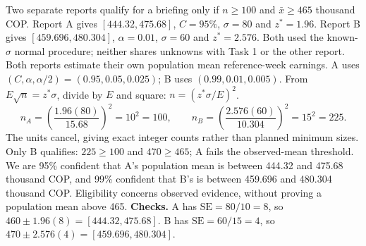 Two separate reports qualify for a briefing only if $n\ge100$ and $\bar x\ge465$ thousand COP. Report A gives $[444.32,475.68]$, $C=95\%$, $\sigma=80$ and $z^*=1.96$. Report B gives $[459.696,480.304]$, $\alpha=0.01$, $\sigma=60$ and $z^*=2.576$. Both used the known-$\sigma$ normal procedure; neither shares unknowns with Task 1 or the other report.
Both reports estimate their own population mean reference-week earnings. A uses $(C,\alpha,\alpha/2)=(0.95,0.05,0.025)$; B uses $(0.99,0.01,0.005)$.
From $E\sqrt n=z^*\sigma$, divide by $E$ and square: $n=(z^*\sigma/E)^2$.
\[
n_A=\left(\frac{1.96(80)}{15.68}\right)^2=10^2=100,
\qquad n_B=\left(\frac{2.576(60)}{10.304}\right)^2=15^2=225.
\]
The units cancel, giving exact integer counts rather than planned minimum sizes.
Only B qualifies: $225\ge100$ and $470\ge465$; A fails the observed-mean threshold. We are 95\% confident that A's population mean is between 444.32 and 475.68 thousand COP, and 99\% confident that B's is between 459.696 and 480.304 thousand COP. Eligibility concerns observed evidence, without proving a population mean above 465.
\textbf{Checks.} A has $\mathrm{SE}=80/10=8$, so $460\pm1.96(8)=[444.32,475.68]$. B has $\mathrm{SE}=60/15=4$, so $470\pm2.576(4)=[459.696,480.304]$.

